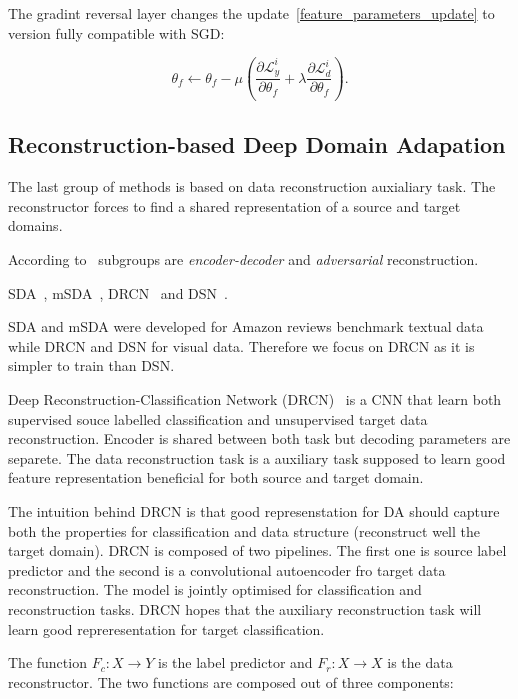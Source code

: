 The gradint reversal layer changes the update~\ref{feature_parameters_update}
to version fully compatible with SGD:

\begin{equation}
	\theta_f \gets \theta_f - \mu \left(
	\frac{\partial \mathcal{L}_y^i}{\partial \theta_f}
	+ \lambda \frac{\partial \mathcal{L}_d^i}{\partial \theta_f}
	\right).
\end{equation}

\subsection{Reconstruction-based Deep Domain Adapation}
\label{reconstruction_da}

The last group of methods is based on data reconstruction auxialiary task.
The reconstructor forces to find a shared representation
of a source and target domains.

According to~\cite{wang2018} subgroups are \textit{encoder-decoder} and
\textit{adversarial} reconstruction.

SDA~\cite{vincent2008, glorot2011}, mSDA~\cite{chen2012}, DRCN~\cite{ghifary2016} and DSN~\cite{bousmalis2016}.

SDA and mSDA were developed for Amazon reviews benchmark textual data
while DRCN and DSN for visual data.
Therefore we focus on DRCN as it is simpler to train than DSN.

Deep Reconstruction-Classification Network (DRCN)~\cite{ghifary2016} is a CNN
that learn both supervised souce labelled classification and unsupervised target data reconstruction.
Encoder is shared between both task but decoding parameters are separete.
The data reconstruction task is a auxiliary task supposed to learn good feature representation beneficial for both source and target domain.

The intuition behind DRCN is that good represenstation for DA
should capture both the properties for classification
and data structure (reconstruct well the target domain).
DRCN is composed of two pipelines.
The first one is source label predictor
and the second is a convolutional autoencoder fro target data reconstruction.
The model is jointly optimised for classification and reconstruction tasks.
DRCN hopes that the auxiliary reconstruction task will learn good repreresentation for target classification.

The function \(F_c: X \to Y\) is the label predictor
and \(F_r: X \to X\) is the data reconstructor.
The two functions are composed out of three components:

